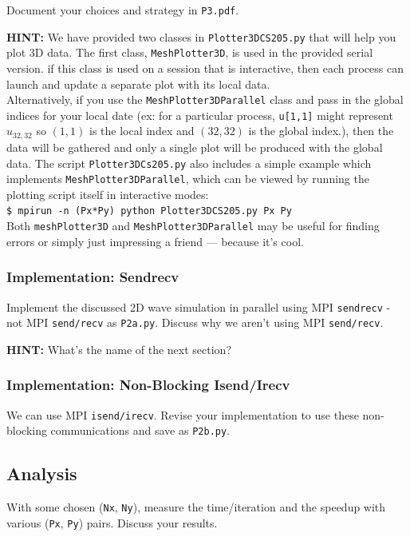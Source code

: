 \documentclass[12pt]{article}
\begin{document}
Document your choices and strategy in \texttt{P3.pdf}.

\textbf{HINT:} We have provided two classes in \texttt{Plotter3DCS205.py} that will help you plot 3D data.  The first class, \texttt{MeshPlotter3D}, is used in the provided serial version.  if this class is used on a session that is interactive, then each process can launch and update a separate plot with its local data.  \\

Alternatively, if you use the \texttt{MeshPlotter3DParallel} class and pass in the global indices for your local date (ex: for a particular process, \texttt{u[1,1]} might represent $u_{32,32}$ so $(1,1)$ is the local index and $(32,32)$ is the global index.), then the data will be gathered and only a single plot will be produced with the global data.  The script \texttt{Plotter3DCs205.py} also includes a simple example which implements \texttt{MeshPlotter3DParallel}, which can be viewed by running the plotting script itself in interactive modes: \\

\texttt{\$ mpirun -n (Px*Py) python Plotter3DCS205.py Px Py}\\

Both \texttt{meshPlotter3D} and \texttt{MeshPlotter3DParallel} may be useful for finding errors or simply just impressing a friend --- because it's cool.

\subsubsection*{Implementation: Sendrecv}

Implement the discussed 2D wave simulation in parallel using MPI \texttt{sendrecv} - not MPI \texttt{send/recv} as \texttt{P2a.py}.  Discuss why we aren't using MPI \texttt{send/recv}.

\textbf{HINT:} What's the name of the next section?

\subsubsection*{Implementation: Non-Blocking Isend/Irecv}

We can use MPI \texttt{isend/irecv}.  Revise your implementation to use these non-blocking communications and save as \texttt{P2b.py}.

\subsection*{Analysis}
With some chosen (\texttt{Nx}, \texttt{Ny}), measure the time/iteration and the speedup with various (\texttt{Px}, \texttt{Py}) pairs.  Discuss your results.
\end{document}
